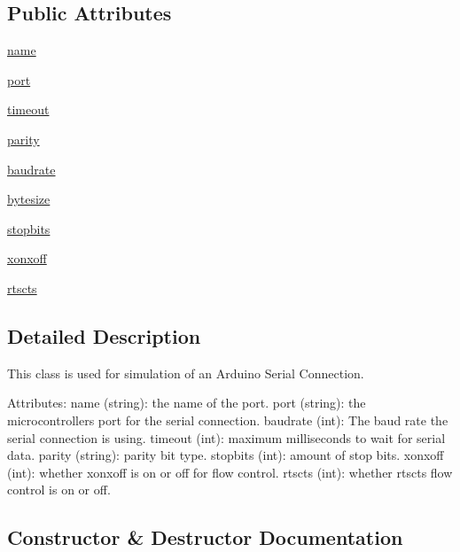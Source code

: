 \subsection*{Public Attributes}
\begin{DoxyCompactItemize}
\item 
\mbox{\hyperlink{classfake_serial_1_1_serial_af3d8449c9f1992bbe479981375083651}{name}}
\item 
\mbox{\hyperlink{classfake_serial_1_1_serial_a53d2e25f2f6b6654ba6740cb57242758}{port}}
\item 
\mbox{\hyperlink{classfake_serial_1_1_serial_aac1940cde2e2c8018d9be60b53bd6644}{timeout}}
\item 
\mbox{\hyperlink{classfake_serial_1_1_serial_a0b5e1c24e2dd47ba832bd4a26b5c0027}{parity}}
\item 
\mbox{\hyperlink{classfake_serial_1_1_serial_afe5ee18e12722951265fdd9d4fa81a51}{baudrate}}
\item 
\mbox{\hyperlink{classfake_serial_1_1_serial_afc2c7273bcb952833c250bda88ba2d08}{bytesize}}
\item 
\mbox{\hyperlink{classfake_serial_1_1_serial_ac0e590a34ac343c929e4a8543e933cce}{stopbits}}
\item 
\mbox{\hyperlink{classfake_serial_1_1_serial_a66d563b6efbcddbe5b6b295f5446a268}{xonxoff}}
\item 
\mbox{\hyperlink{classfake_serial_1_1_serial_aadb7fe53208ef570c79b1b66d8eb2ad7}{rtscts}}
\end{DoxyCompactItemize}


\subsection{Detailed Description}
\begin{DoxyVerb}This class is used for simulation of an Arduino Serial Connection.

Attributes:
    name (string): the name of the port.
    port (string): the microcontrollers port for the serial connection.
    baudrate (int): The baud rate the serial connection is using.
    timeout (int): maximum milliseconds to wait for serial data.
    parity (string): parity bit type.
    stopbits (int): amount of stop bits.
    xonxoff (int): whether xonxoff is on or off for flow control.
    rtscts (int): whether rtscts flow control is on or off.
\end{DoxyVerb}
 

\subsection{Constructor \& Destructor Documentation}
\mbox{\label{classfake_serial_1_1_serial_abcf3b27b5edb193420574f383ff1603c}} 
